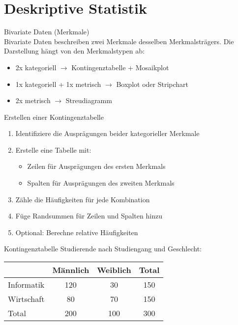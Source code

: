 \section{Deskriptive Statistik}

\begin{definition}{Bivariate Daten (Merkmale)}\\
Bivariate Daten beschreiben zwei Merkmale desselben Merkmalsträgers. Die Darstellung hängt von den Merkmalstypen ab:
\begin{itemize}
  \item 2x kategoriell $\rightarrow$ Kontingenztabelle + Mosaikplot
  \item 1x kategoriell + 1x metrisch $\rightarrow$ Boxplot oder Stripchart
  \item 2x metrisch $\rightarrow$ Streudiagramm
\end{itemize}
\end{definition}

\begin{KR}{Erstellen einer Kontingenztabelle}
\begin{enumerate}
    \item Identifiziere die Ausprägungen beider kategorieller Merkmale
    \item Erstelle eine Tabelle mit:
        \begin{itemize}
            \item Zeilen für Ausprägungen des ersten Merkmals
            \item Spalten für Ausprägungen des zweiten Merkmals
        \end{itemize}
    \item Zähle die Häufigkeiten für jede Kombination
    \item Füge Randsummen für Zeilen und Spalten hinzu
    \item Optional: Berechne relative Häufigkeiten
\end{enumerate}
\end{KR}

\begin{example2}{Kontingenztabelle}
Studierende nach Studiengang und Geschlecht:
\begin{center}
\begin{tabular}{|l|c|c|c|}
\hline
 & Männlich & Weiblich & Total \\
\hline
Informatik & 120 & 30 & 150 \\
Wirtschaft & 80 & 70 & 150 \\
\hline
Total & 200 & 100 & 300 \\
\hline
\end{tabular}
\end{center}
\end{example2}

